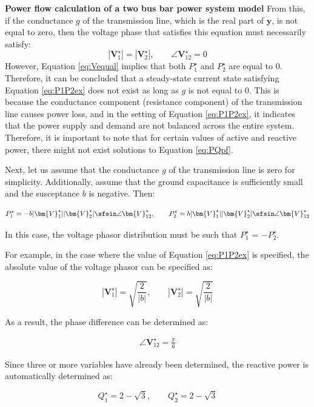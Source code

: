 \documentclass[graybox, envcountchap]{svmult}
\begin{document}
\begin{example}{\textbf{\textbf{Power flow calculation of a two bus bar power system
model}}}
From this, if the conductance $g$ of the transmission line, which is the real
part of $\bm{y}$, is not equal to zero, then the voltage phase that satisfies
this equation must necessarily satisfy:
\begin{equation}\label{eq:Vequal}
  |\bm{V}_1^{\star}| = |\bm{V}_2^{\star}|,\qquad
  \angle \bm{V}_{12}^{\star} =0
\end{equation}
However, Equation \ref{eq:Vequal} implies that both $P_1^{\star}$ and
$P_2^{\star}$ are equal to 0. Therefore, it can be concluded that a steady-state
current state satisfying Equation \ref{eq:P1P2ex} does not exist as long as $g$
is not equal to 0. This is because the conductance component (resistance
component) of the transmission line causes power loss, and in the setting of
Equation \ref{eq:P1P2ex}, it indicates that the power supply and demand are not
balanced across the entire system. Therefore, it is important to note that for
certain values of active and reactive power, there might not exist solutions to
Equation \ref{eq:PQpf}.

Next, let us assume that the conductance $g$ of the transmission line is zero
for simplicity. Additionally, assume that the ground capacitance is sufficiently
small and the susceptance $b$ is negative. Then:

\begin{equation*}
  P_1^{\star} = -b  |\bm{V}_1^{\star}| |\bm{V}_2^{\star}| \sfsin \angle \bm{V}_{12}^{\star}, \qquad
  P_2^{\star}  =   b |\bm{V}_1^{\star}| |\bm{V}_2^{\star}| \sfsin \angle \bm{V}_{12}^{\star}
\end{equation*}

In this case, the voltage phasor distribution must be such that $P_1^{\star}$ =
$-P_2^{\star}$.

For example, in the case where the value of Equation \ref{eq:P1P2ex} is
specified, the absolute value of the voltage phasor can be specified as:

\begin{equation*}\textstyle
  |\bm{V}_1^{\star}|=\sqrt{
    \frac{2}{|b|}
  }
  ,\qquad
  |\bm{V}_2^{\star}| 
  =
  \sqrt{
    \frac{2}{|b|}
  }
\end{equation*}

As a result, the phase difference can be determined as:

\begin{align*}
\angle \bm{V}_{12}^{\star} = \frac{\pi}{6}
\end{align*}

Since three or more variables have already been determined, the reactive power
is automatically determined as:

\begin{equation*}
  Q_1^{\star} = 2 -\sqrt{3},\qquad
  Q_2^{\star} = 2 -\sqrt{3}
\end{equation*}
\end{example}
\end{document}

